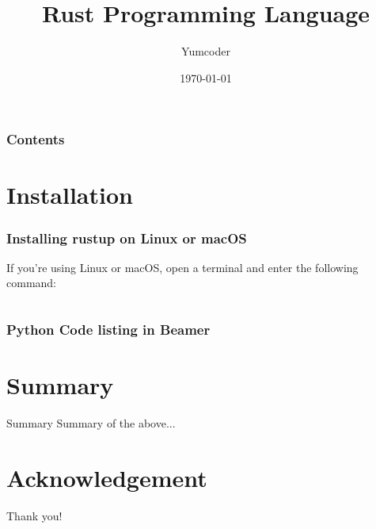 \documentclass{beamer}
\title[Rust-Lang]{Rust Programming Language}
\author[Yumcoder]{Yumcoder}
\institute[UoT]{University of Toronto}
\date[{\today} ]
{\today}
\begin{document}
\frame{\titlepage}
\begin{frame}
\frametitle{Contents}
\tableofcontents
\end{frame}
\section{Installation}
\begin{frame}[fragile]
\frametitle{Installing rustup on Linux or macOS}
If you’re using Linux or macOS, open a terminal and enter the following command:
\scriptsize
\inputminted[bgcolor=greyColor,linenos, breaklines,frame=leftline, numbersep=1pt,mathescape]{shell}{/Users/yumcoder/Desktop/rust-lang/install.shell.tex}
\end{frame}

\begin{frame}[fragile]
\frametitle{Python Code listing in Beamer}
\end{frame}

\section{Summary}

\begin{frame}{Summary}
Summary of the above...
\end{frame}

\section*{Acknowledgement}  
\begin{frame}
\Huge{\centerline{Thank you!}}
\end{frame}
\end{document}
